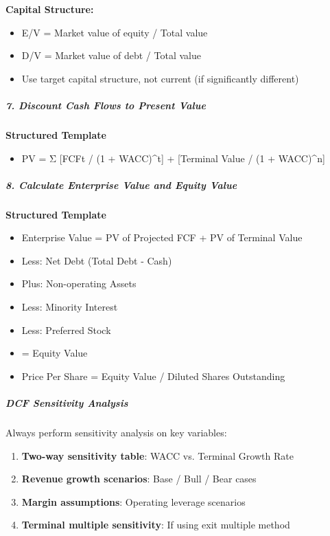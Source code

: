 \documentclass[11pt]{article}
\begin{document}
\textbf{Capital Structure:}

\begin{itemize}[leftmargin=*,itemsep=2pt,topsep=2pt]
\item {} E/V = Market value of equity / Total value
\item {} D/V = Market value of debt / Total value
\item {} Use target capital structure, not current (if significantly different)
\end{itemize}

\subparagraph{7. Discount Cash Flows to Present Value}\mbox{}\par

\textbf{Structured Template}
\begin{itemize}[leftmargin=*,itemsep=2pt,topsep=2pt]
\item {} PV = Σ [FCFt / (1 + WACC)\textasciicircum{}t] + [Terminal Value / (1 + WACC)\textasciicircum{}n]
\end{itemize}

\subparagraph{8. Calculate Enterprise Value and Equity Value}\mbox{}\par

\textbf{Structured Template}
\begin{itemize}[leftmargin=*,itemsep=2pt,topsep=2pt]
\item {} Enterprise Value = PV of Projected FCF + PV of Terminal Value
\item {} Less: Net Debt (Total Debt - Cash)
\item {} Plus: Non-operating Assets
\item {} Less: Minority Interest
\item {} Less: Preferred Stock
\item {} = Equity Value
\item {} Price Per Share = Equity Value / Diluted Shares Outstanding
\end{itemize}

\subparagraph{DCF Sensitivity Analysis}\mbox{}\par

Always perform sensitivity analysis on key variables:


\begin{enumerate}[leftmargin=*,itemsep=2pt,topsep=2pt]
\item {} \textbf{Two-way sensitivity table}: WACC vs. Terminal Growth Rate
\item {} \textbf{Revenue growth scenarios}: Base / Bull / Bear cases
\item {} \textbf{Margin assumptions}: Operating leverage scenarios
\item {} \textbf{Terminal multiple sensitivity}: If using exit multiple method
\end{enumerate}
\end{document}
